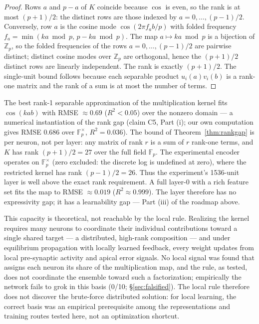 \documentclass[11pt]{article}
\begin{document}
\begin{proof}
Rows $a$ and $p-a$ of $K$ coincide because $\cos$ is even, so the rank is at most $(p+1)/2$: the distinct rows are those indexed by $a = 0, \dots, (p-1)/2$. Conversely, row $a$ is the cosine mode $\cos(2\pi f_a b / p)$ with folded frequency $f_a = \min(ka \bmod p,\, p - ka \bmod p)$. The map $a \mapsto ka \bmod p$ is a bijection of $\mathbb{Z}_p$, so the folded frequencies of the rows $a = 0, \dots, (p-1)/2$ are pairwise distinct; distinct cosine modes over $\mathbb{Z}_p$ are orthogonal, hence the $(p+1)/2$ distinct rows are linearly independent. The rank is exactly $(p+1)/2$. The single-unit bound follows because each separable product $u_i(a)v_i(b)$ is a rank-one matrix and the rank of a sum is at most the number of terms.
\end{proof}

The best rank-1 separable approximation of the multiplication kernel fits $\cos(kab)$ with RMSE $\approx 0.69$ ($R^2 < 0.05$) over the nonzero domain --- a numerical instantiation of the rank gap (claim C5, Part (i); our own computation gives RMSE $0.686$ over $\mathbb{F}_p^\times$, $R^2 = 0.036$). The bound of Theorem~\ref{thm:rankgap} is per neuron, not per layer: any matrix of rank $r$ is a sum of $r$ rank-one terms, and $K$ has rank $(p+1)/2 = 27$ over the full field $\mathbb{F}_p$. The experimental encoder operates on $\mathbb{F}_p^\times$ (zero excluded: the discrete log is undefined at zero), where the restricted kernel has rank $(p-1)/2 = 26$. Thus the experiment's 1536-unit layer is well above the exact rank requirement. A full layer-0 with a rich feature set fits the map to RMSE $\approx 0.019$ ($R^2 \approx 0.999$). The layer therefore has no expressivity gap; it has a learnability gap --- Part (iii) of the roadmap above.

This capacity is theoretical, not reachable by the local rule. Realizing the kernel requires many neurons to coordinate their individual contributions toward a single shared target --- a distributed, high-rank composition --- and under equilibrium propagation with locally learned feedback, every weight updates from local pre-synaptic activity and apical error signals. No local signal was found that assigns each neuron its share of the multiplication map, and the rule, as tested, does not coordinate the ensemble toward such a factorization; empirically the network fails to grok in this basis (0/10; \S\ref{sec:falsified}). The local rule therefore does not discover the brute-force distributed solution: for local learning, the correct basis was an empirical prerequisite among the representations and training routes tested here, not an optimization shortcut.
\end{document}
